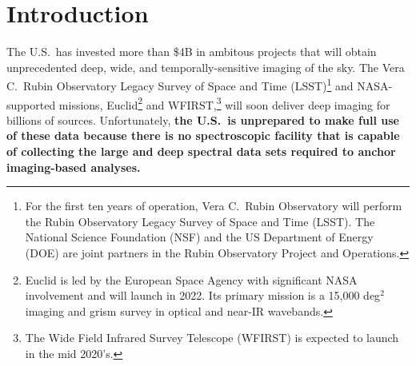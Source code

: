 \documentclass[oneside,11pt]{amsart}
\begin{document}



\setcounter{page}{1}


\section{Introduction}

The U.S.\ has invested more than \$4B in ambitous projects that will obtain unprecedented deep, wide, and temporally-sensitive imaging of the sky.  The Vera C.~Rubin Observatory Legacy Survey of Space and Time (LSST)\footnote{For the first ten years of operation, Vera C.~Rubin Observatory will perform the Rubin Observatory Legacy Survey of Space and Time (LSST). The National Science Foundation (NSF) and the US Department of Energy (DOE) are joint partners in the Rubin Observatory Project and Operations.} and NASA-supported missions, Euclid\footnote{Euclid is led by the European Space Agency with significant NASA involvement and will launch in 2022. Its primary mission is a 15,000 deg$^2$ imaging and grism survey in optical and near-IR wavebands.} and WFIRST,\footnote{The Wide Field Infrared Survey Telescope (WFIRST) is expected to launch in the mid 2020's.} will soon deliver deep imaging for billions of sources.  Unfortunately, \textbf{the U.S.\ is unprepared to make full use of these data because there is no spectroscopic facility that is capable of collecting the large and deep spectral data sets required to anchor imaging-based analyses.}
\end{document}
